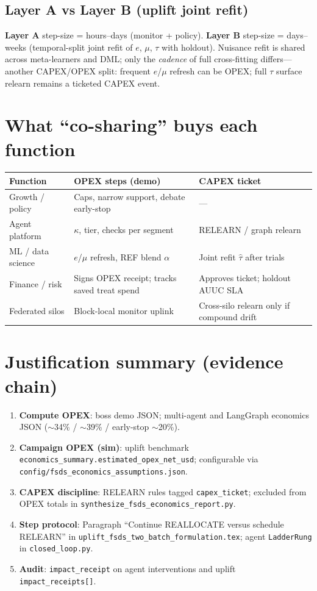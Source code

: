 \documentclass[11pt]{article}
\begin{document}
\subsection{Layer A vs Layer B (uplift joint refit)}
\textbf{Layer A} step-size = hours--days (monitor + policy).
\textbf{Layer B} step-size = days--weeks (temporal-split joint refit of $e$, $\mu$, $\tau$ with holdout).
Nuisance refit is shared across meta-learners and DML; only the \emph{cadence} of full cross-fitting differs---another CAPEX/OPEX split: frequent $e$/$\mu$ refresh can be OPEX; full $\tau$ surface relearn remains a ticketed CAPEX event.

\section{What ``co-sharing'' buys each function}
\begin{table}[h]
\centering
\small
\begin{tabular}{@{}lll@{}}
\toprule
Function & OPEX steps (demo) & CAPEX ticket \\
\midrule
Growth / policy & Caps, narrow support, debate early-stop & --- \\
Agent platform & $\kappa$, tier, checks per segment & RELEARN / graph relearn \\
ML / data science & $e$/$\mu$ refresh, REF blend $\alpha$ & Joint refit $\hat\tau$ after trials \\
Finance / risk & Signs OPEX receipt; tracks saved treat spend & Approves ticket; holdout AUUC SLA \\
Federated silos & Block-local monitor uplink & Cross-silo relearn only if compound drift \\
\bottomrule
\end{tabular}
\end{table}

\section{Justification summary (evidence chain)}
\begin{enumerate}[nosep]
  \item \textbf{Compute OPEX}: boss demo JSON; multi-agent and LangGraph economics JSON ($\sim$34\% / $\sim$39\% / early-stop $\sim$20\%).
  \item \textbf{Campaign OPEX (sim)}: uplift benchmark \texttt{economics\_summary.estimated\_opex\_net\_usd}; configurable via \texttt{config/fsds\_economics\_assumptions.json}.
  \item \textbf{CAPEX discipline}: RELEARN rules tagged \texttt{capex\_ticket}; excluded from OPEX totals in \texttt{synthesize\_fsds\_economics\_report.py}.
  \item \textbf{Step protocol}: Paragraph ``Continue REALLOCATE versus schedule RELEARN'' in \texttt{uplift\_fsds\_two\_batch\_formulation.tex}; agent \texttt{LadderRung} in \texttt{closed\_loop.py}.
  \item \textbf{Audit}: \texttt{impact\_receipt} on agent interventions and uplift \texttt{impact\_receipts[]}.
\end{enumerate}
\end{document}
